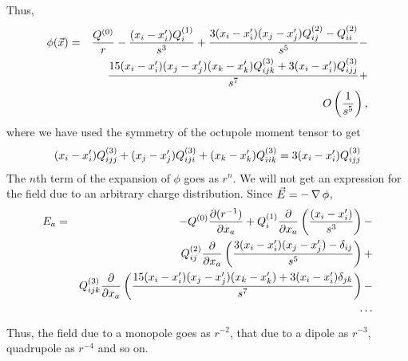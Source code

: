 Thus,
\begin{eqnarray*}
\phi(\vec{x}) &=& \frac{Q^{(0)}}{r} - \frac{(x_i - x_i^\prime)Q_i^{(1)}}{s^3} + \frac{3(x_i - x_i^\prime)(x_j - x_j^\prime)Q_{ij}^{(2)} - Q_{ii}^{(2)}}{s^5} -\\
 & & \frac{15(x_i - x_i^\prime)(x_j - x_j^\prime)(x_k - x_k^\prime)Q_{ijk}^{(3)} + 3(x_i - x_i^\prime)Q_{ijj}^{(3)}}{s^7} + \\ 
 & & O\left(\frac{1}{s^5}\right),
\end{eqnarray*}
where we have used the symmetry of the octupole moment tensor to get
\[
(x_i - x_i^\prime)Q_{ijj}^{(3)} + (x_j - x_j^\prime)Q_{iji}^{(3)} + (x_k - x_k^\prime)Q_{iik}^{(3)} = 3(x_i - x_i^\prime)Q_{ijj}^{(3)}
\]
The $n$th term of the expansion of $\phi$ goes as $r^{n}$. We will not get an expression for the field due to an arbitrary charge distribution. Since $\vec{E} = -\operatorname{\nabla}{\phi}$,
\begin{eqnarray*}
E_a &=& - Q^{(0)}\frac{\partial{(r^{-1})}}{\partial{x_a}} + Q_i^{(1)}\frac{\partial}{\partial x_a}\left(\frac{(x_i - x_i^\prime)}{s^3}\right) - \\
 & & Q_{ij}^{(2)}\frac{\partial}{\partial x_a}\left(\frac{3(x_i - x_i^\prime)(x_j - x_j^\prime) - \delta_{ij}}{s^5}\right) + \\
 & & Q_{ijk}^{(3)}\frac{\partial}{\partial x_a}\left(\frac{15(x_i - x_i^\prime)(x_j - x_j^\prime)(x_k - x_k^\prime) + 3(x_i - x_i^\prime)\delta_{jk}}{s^7}\right) - \\
 & & \cdots
\end{eqnarray*}
Thus, the field due to a monopole goes as $r^{-2}$, that due to a dipole as $r^{-3}$, quadrupole as $r^{-4}$ and so on.

